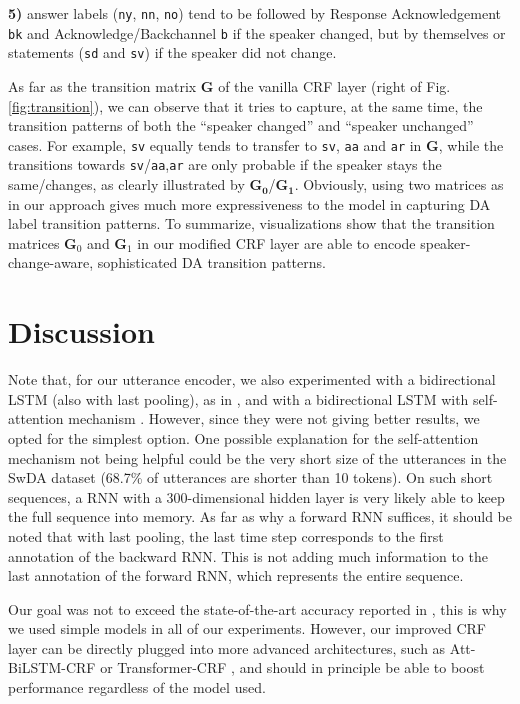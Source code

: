 \documentclass[11pt,a4paper]{article}
\begin{document}
\noindent \textbf{5)} answer labels (\texttt{ny}, \texttt{nn}, \texttt{no}) tend to be followed by Response Acknowledgement \texttt{bk} and Acknowledge/Backchannel \texttt{b} if the speaker changed, but by themselves or statements (\texttt{sd} and \texttt{sv}) if the speaker did not change.

As far as the transition matrix $\mathbf{G}$ of the vanilla CRF layer (right of Fig. \ref{fig:transition}), we can observe that it tries to capture, at the same time, the transition patterns of both the ``speaker changed'' and ``speaker unchanged'' cases.
For example, \texttt{sv} equally tends to transfer to \texttt{sv}, \texttt{aa} and \texttt{ar} in $\mathbf{G}$, while the transitions towards \texttt{sv}/\texttt{aa},\texttt{ar} are only probable if the speaker stays the same/changes, as clearly illustrated by $\mathbf{G_0}$/$\mathbf{G_1}$.
Obviously, using two matrices as in our approach gives much more expressiveness to the model in capturing DA label transition patterns.
To summarize, visualizations show that the transition matrices $\mathbf{G}_0$ and $\mathbf{G}_1$ in our modified CRF layer are able to encode speaker-change-aware, sophisticated DA transition patterns.

\section{Discussion}

Note that, for our utterance encoder, we also experimented with a bidirectional LSTM (also with last pooling), as in \citep{kumar2018dialogue}, and with a bidirectional LSTM with self-attention mechanism \citep{yang-etal-2016-hierarchical}.
However, since they were not giving better results, we opted for the simplest option.
One possible explanation for the self-attention mechanism not being helpful could be the very short size of the utterances in the SwDA dataset (68.7\% of utterances are shorter than 10 tokens).
On such short sequences, a RNN with a 300-dimensional hidden layer is very likely able to keep the full sequence into memory.
As far as why a forward RNN suffices, it should be noted that with last pooling, the last time step corresponds to the first annotation of the backward RNN.
This is not adding much information to the last annotation of the forward RNN, which represents the entire sequence.

Our goal was not to exceed the state-of-the-art accuracy reported in \cite{li-etal-2019-dual,raheja-tetreault-2019-dialogue}, this is why we used simple models in all of our experiments.
However, our improved CRF layer can be directly plugged into more advanced architectures, such as Att-BiLSTM-CRF \citep{luo2018attention} or Transformer-CRF \citep{chen2019bert,zhang2019using,yan2019tener,winata2019hierarchical}, and should in principle be able to boost performance regardless of the model used.
\end{document}
